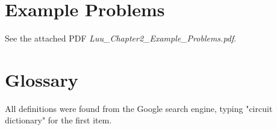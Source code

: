 \documentclass[12pt]{article}
\begin{document}
\section{Example Problems}

See the attached PDF \textit{Luu\_Chapter2\_Example\_Problems.pdf}.

\section{Glossary}

All definitions were found from the Google search engine, typing "circuit dictionary" for the first item.
\end{document}
